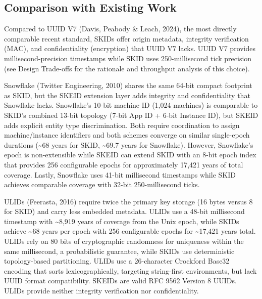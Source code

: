 \documentclass[fleqn,10pt,lineno]{wlpeerj}
\begin{document}
\subsection{Comparison with Existing
Work}\label{comparison-with-existing-work}

Compared to UUID V7 (Davis, Peabody \& Leach, 2024), the most directly
comparable recent standard, SKIDs offer origin metadata, integrity
verification (MAC), and confidentiality (encryption) that UUID V7 lacks.
UUID V7 provides millisecond-precision timestamps while SKID uses
250-millisecond tick precision (see Design Trade-offs for the rationale
and throughput analysis of this choice).

Snowflake (Twitter Engineering, 2010) shares the same 64-bit compact
footprint as SKID, but the SKEID extension layer adds integrity and
confidentiality that Snowflake lacks. Snowflake's 10-bit machine ID
(1,024 machines) is comparable to SKID's combined 13-bit topology (7-bit
App ID + 6-bit Instance ID), but SKEID adds explicit entity type
discrimination. Both require coordination to assign machine/instance
identifiers and both schemes converge on similar single-epoch durations
(\textasciitilde68 years for SKID, \textasciitilde69.7 years for
Snowflake). However, Snowflake's epoch is non-extensible while SKEID can
extend SKID with an 8-bit epoch index that provides 256 configurable
epochs for approximately 17,421 years of total coverage. Lastly,
Snowflake uses 41-bit millisecond timestamps while SKID achieves
comparable coverage with 32-bit 250-millisecond ticks.

ULIDs (Feerasta, 2016) require twice the primary key storage (16 bytes
versus 8 for SKID) and carry less embedded metadata. ULIDs use a 48-bit
millisecond timestamp with \textasciitilde8,919 years of coverage from
the Unix epoch, while SKIDs achieve \textasciitilde68 years per epoch
with 256 configurable epochs for \textasciitilde17,421 years total.
ULIDs rely on 80 bits of cryptographic randomness for uniqueness within
the same millisecond, a probabilistic guarantee, while SKIDs use
deterministic topology-based partitioning. ULIDs use a 26-character
Crockford Base32 encoding that sorts lexicographically, targeting
string-first environments, but lack UUID format compatibility. SKEIDs
are valid RFC 9562 Version 8 UUIDs. ULIDs provide neither integrity
verification nor confidentiality.
\end{document}
